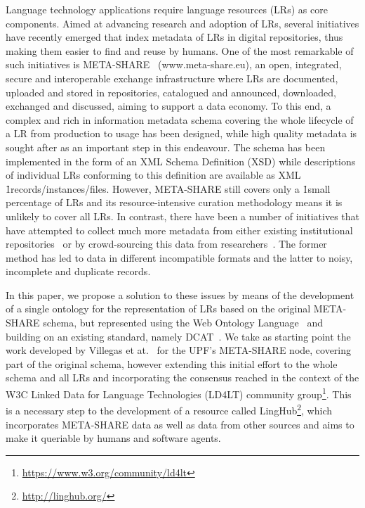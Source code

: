 \documentclass{llncs}
\begin{document}
Language technology applications require language resources (LRs) as core components. Aimed at advancing research and adoption of LRs, several initiatives have recently emerged that index metadata of LRs in digital repositories, thus making them easier to find and reuse by humans. One of the most remarkable of such initiatives is META-SHARE~\cite{piperidis2012meta} (www.meta-share.eu), an open, integrated, secure and interoperable exchange infrastructure where LRs are documented, uploaded and stored in repositories, catalogued and announced, downloaded, exchanged and discussed, aiming to support a data economy. To this end, a complex and rich in information metadata schema covering the whole lifecycle of a LR from production to usage has been designed, while high quality metadata is sought after as an important step in this endeavour. The schema has been implemented in the form of an XML Schema Definition (XSD) while descriptions of individual LRs conforming to this definition are available as XML \h1{records/instances/files}. 
However, META-SHARE still covers only a \h1{small percentage of LRs} and its
resource-intensive curation methodology means it is unlikely to cover all
LRs. In contrast, there have been a number of initiatives that have
attempted to collect much more metadata from either existing institutional
repositories~\cite[CLARIN]{broeder2010data} or by crowd-sourcing this data from
researchers~\cite[LRE-Map]{calzolari2012lre}. The former method has led to
data in different incompatible formats and the latter to noisy, incomplete and
duplicate records.

In this paper, we propose a solution to these issues by means of the development
of a single ontology for the representation of LRs based on the
original META-SHARE schema, but represented using the Web Ontology
Language~\cite{motik2012owl} and building on an existing standard, namely
DCAT~\cite{maali2014data}. 
We take as starting point the work developed by Villegas et at.~\cite{Villegas2014} for the UPF's META-SHARE node, covering part of the original schema, however extending this initial effort to the whole schema and all LRs and incorporating the consensus reached in the context of the W3C Linked Data for Language Technologies (LD4LT) community group\footnote{\url{https://www.w3.org/community/ld4lt}}. 
This is a necessary step to the development of a
resource called LingHub\footnote{\url{http://linghub.org/}}, which incorporates
META-SHARE data as well as data from other sources and aims to make it queriable
by humans and software agents.
\end{document}
